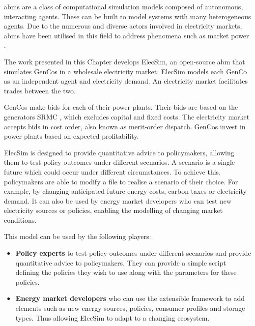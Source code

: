 \acrfull{abms} are a class of computational simulation models composed of autonomous, interacting agents. These can be built to model systems with many heterogeneous agents. Due to the numerous and diverse actors involved in electricity markets, \acrshort{abms} have been utilised in this field to address phenomena such as market power \cite{Ringler2016a}. 

The work presented in this Chapter develops ElecSim, an open-source \acrshort{abm} that simulates GenCos in a wholesale electricity market. ElecSim models each GenCo as an independent agent and electricity demand. An electricity market facilitates trades between the two. 

GenCos make bids for each of their power plants. Their bids are based on the generators \gls{SRMC} \cite{Perloff2012}, which excludes capital and fixed costs. The electricity market accepts bids in cost order, also known as merit-order dispatch. GenCos invest in power plants based on expected profitability.	

ElecSim is designed to provide quantitative advice to policymakers, allowing them to test policy outcomes under different scenarios. A scenario is a single future which could occur under different circumstances. To achieve this, policymakers are able to modify a file to realise a scenario of their choice. For example, by changing anticipated future energy costs, carbon taxes or electricity demand. It can also be used by energy market developers who can test new electricity sources or policies, enabling the modelling of changing market conditions.

This model can be used by the following players:

\begin{itemize}
	\item {\bf Policy experts} to test policy outcomes under different scenarios and provide quantitative advice to policymakers. They can provide a simple script defining the policies they wish to use along with the parameters for these policies.
	\item {\bf Energy market developers} who can use the extensible framework to add elements such as new energy sources, policies, consumer profiles and storage types. Thus allowing ElecSim to adapt to a changing ecosystem.
\end{itemize}





